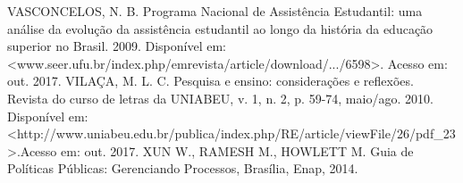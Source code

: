 VASCONCELOS, N. B. Programa Nacional de Assistência Estudantil: uma análise da evolução da assistência estudantil ao longo da história da educação superior no Brasil. 2009. Disponível em: <www.seer.ufu.br/index.php/emrevista/article/download/.../6598>. Acesso em: out. 2017.
VILAÇA, M. L. C. Pesquisa e ensino: considerações e reflexões. Revista do curso de letras da UNIABEU, v. 1, n. 2, p. 59-74, maio/ago. 2010. Disponível em: <http://www.uniabeu.edu.br/publica/index.php/RE/article/viewFile/26/pdf_23>.Acesso em: out. 2017.
XUN W., RAMESH M., HOWLETT M. Guia de Políticas Públicas: Gerenciando Processos, Brasília, Enap, 2014.




